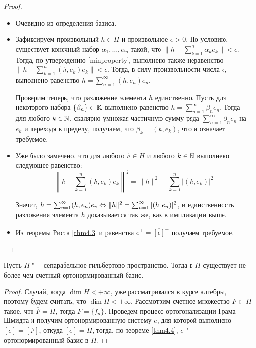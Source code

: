 \begin{proof}~
	\begin{itemize}
		\item{}Очевидно из определения базиса.
  
		\item{}Зафиксируем произвольный $h \in H$ и произвольное $\epsilon > 0$. По условию, существует конечный набор $\alpha_1, \dotsc, \alpha_n$ такой, что $\|h - \sum_{k = 1}^n\alpha_k e_k\| < \epsilon$. Тогда, по утверждению \ref{minproperty}, выполнено также неравенство $\|h - \sum_{k = 1}^n(h, e_k) e_k\| < \epsilon$. Тогда, в силу произвольности числа $\epsilon$, выполнено равенство $h = \sum_{n = 1}^\infty (h, e_n)e_n$.
		
		Проверим теперь, что разложение элемента $h$ единственно. Пусть для некоторого набора $\{\beta_n\} \subset \mathbb{K}$ выполнено равенство $h = \sum_{n = 1}^\infty \beta_n e_n$. Тогда для любого $k \in \mathbb{N}$, скалярно умножая частичную сумму ряда $\sum_{n = 1}^\infty\beta_n e_n$ на $e_k$ и переходя к пределу, получаем, что $\beta_k = (h, e_k)$, что и означает требуемое.
  
		\item{}Уже было замечено, что для любого $h \in H$ и любого $k \in \mathbb{N}$ выполнено следующее равенство:
		\[\left\|h - \sum_{k = 1}^n(h, e_k)e_k\right\|^2 = \|h\|^2 - \sum_{k = 1}^n|(h, e_k)|^2\]
		
		Значит, $h = \sum_{n = 1}^\infty (h, e_n)e_n \Leftrightarrow \|h\|^2 = \sum_{n = 1}^\infty |(h, e_n)|^2$, и единственность разложения элемента $h$ доказывается так же, как в импликации выше.
  
		\item{}Из теоремы Рисса \ref{thm4.3} и равенства $e^\perp = \overline{[e]}^\perp$ получаем требуемое.\qedhere
	\end{itemize}
\end{proof}

\begin{corollary}
	Пусть $H$ "--- сепарабельное гильбертово пространство. Тогда в $H$ существует не более чем счетный ортонормированный базис.
\end{corollary}

\begin{proof}
	Случай, когда $\dim H <+\infty$, уже рассматривался в курсе алгебры, поэтому будем считать, что $\dim H <+\infty$. Рассмотрим счетное множество $F \subset H$ такое, что $\overline F = H$, тогда $F = \{f_n\}$. Проведем процесс ортогонализации Грама---Шмидта и получим ортонормированную систему $e$, для которой выполнено $[e] = [F]$, откуда $\overline{[e]} = H$, тогда, по теореме \ref{thm4.4}, $e$ "--- ортонормированный базис в $H$.  
\end{proof}

